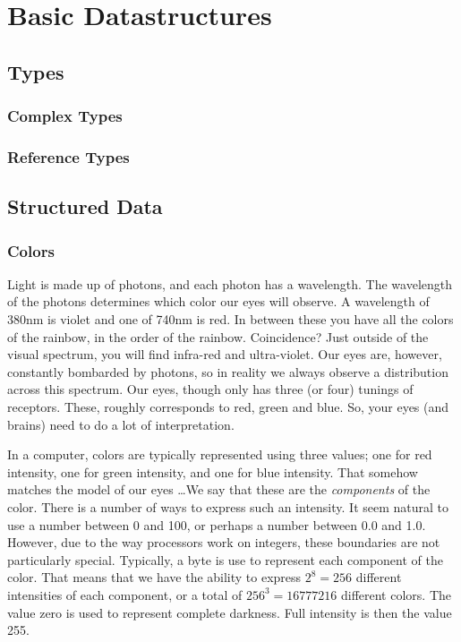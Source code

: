 \chapter{Basic Datastructures}


\section{Types}

\subsection{Complex Types}

\subsection{Reference Types}

\section{Structured Data}

\subsection{Colors}

Light is made up of photons, and each photon has a wavelength. The wavelength of the photons determines which color our eyes will observe. A wavelength of 380nm is violet and one of 740nm is red. In between these you have all the colors of the rainbow, in the order of the rainbow. Coincidence? Just outside of the visual spectrum, you will find infra-red and ultra-violet. Our eyes are, however, constantly bombarded by photons, so in reality we always observe a distribution across this spectrum. Our eyes, though only has three (or four) tunings of receptors. These, roughly corresponds to red, green and blue. So, your eyes (and brains) need to do a lot of interpretation.

In a computer, colors are typically represented using three values; one for red intensity, one for green intensity, and one for blue intensity. That somehow matches the model of our eyes \ldots We say that these are the \textsl{components} of the color. There is a number of ways to express such an intensity. It seem natural to use a number between 0 and 100, or perhaps a number between 0.0 and 1.0. However, due to the way processors work on integers, these boundaries are not particularly special. Typically, a byte is use to represent each component of the color. That means that we have the ability to express $2^8=256$ different intensities of each component, or a total of $256^3=16777216$ different colors. The value zero is used to represent complete darkness. Full intensity is then the value 255.

